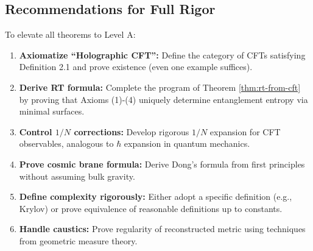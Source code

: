 \documentclass[12pt,a4paper]{article}
\begin{document}
\subsection{Recommendations for Full Rigor}

To elevate all theorems to Level A:

\begin{enumerate}
    \item \textbf{Axiomatize ``Holographic CFT'':} Define the category of CFTs satisfying Definition 2.1 and prove existence (even one example suffices).
    
    \item \textbf{Derive RT formula:} Complete the program of Theorem \ref{thm:rt-from-cft} by proving that Axioms (1)-(4) uniquely determine entanglement entropy via minimal surfaces.
    
    \item \textbf{Control $1/N$ corrections:} Develop rigorous $1/N$ expansion for CFT observables, analogous to $\hbar$ expansion in quantum mechanics.
    
    \item \textbf{Prove cosmic brane formula:} Derive Dong's formula from first principles without assuming bulk gravity.
    
    \item \textbf{Define complexity rigorously:} Either adopt a specific definition (e.g., Krylov) or prove equivalence of reasonable definitions up to constants.
    
    \item \textbf{Handle caustics:} Prove regularity of reconstructed metric using techniques from geometric measure theory.
\end{enumerate}
\end{document}
